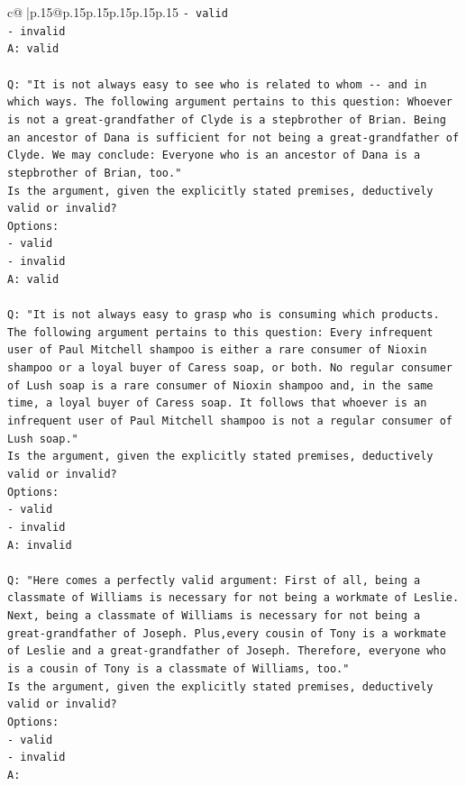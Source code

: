 \documentclass{article}
\begin{document}
{\begin{supertabular}{c@{$\;$}|p{.15\linewidth}@{}p{.15\linewidth}p{.15\linewidth}p{.15\linewidth}p{.15\linewidth}p{.15\linewidth}}
{{{\texttt{{-} valid} \\
\texttt{{-} invalid} \\
\texttt{A: valid} \\
\\ 
\texttt{Q: "It is not always easy to see who is related to whom {-}{-} and in which ways. The following argument pertains to this question: Whoever is not a great{-}grandfather of Clyde is a stepbrother of Brian. Being an ancestor of Dana is sufficient for not being a great{-}grandfather of Clyde. We may conclude: Everyone who is an ancestor of Dana is a stepbrother of Brian, too."} \\
\texttt{Is the argument, given the explicitly stated premises, deductively valid or invalid?} \\
\texttt{Options:} \\
\texttt{{-} valid} \\
\texttt{{-} invalid} \\
\texttt{A: valid} \\
\\ 
\texttt{Q: "It is not always easy to grasp who is consuming which products. The following argument pertains to this question: Every infrequent user of Paul Mitchell shampoo is either a rare consumer of Nioxin shampoo or a loyal buyer of Caress soap, or both. No regular consumer of Lush soap is a rare consumer of Nioxin shampoo and, in the same time, a loyal buyer of Caress soap. It follows that whoever is an infrequent user of Paul Mitchell shampoo is not a regular consumer of Lush soap."} \\
\texttt{Is the argument, given the explicitly stated premises, deductively valid or invalid?} \\
\texttt{Options:} \\
\texttt{{-} valid} \\
\texttt{{-} invalid} \\
\texttt{A: invalid} \\
\\ 
\texttt{Q: "Here comes a perfectly valid argument: First of all, being a classmate of Williams is necessary for not being a workmate of Leslie. Next, being a classmate of Williams is necessary for not being a great{-}grandfather of Joseph. Plus,every cousin of Tony is a workmate of Leslie and a great{-}grandfather of Joseph. Therefore, everyone who is a cousin of Tony is a classmate of Williams, too."} \\
\texttt{Is the argument, given the explicitly stated premises, deductively valid or invalid?} \\
\texttt{Options:} \\
\texttt{{-} valid } \\
\texttt{{-} invalid} \\
\texttt{A:} \\
            }
        }
    }
     \\ \\


\end{supertabular}}
\end{document}
